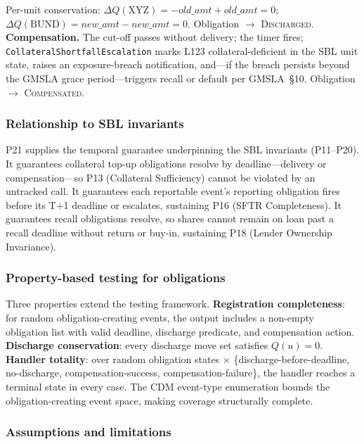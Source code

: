 \noindent Per-unit conservation: $\Delta Q(\text{XYZ}) = -\mathit{old\_amt} + \mathit{old\_amt} = 0$; $\Delta Q(\text{BUND}) = \mathit{new\_amt} - \mathit{new\_amt} = 0$. Obligation $\to$ \textsc{Discharged}. \textbf{Compensation.} The cut-off passes without delivery; the timer fires; \texttt{CollateralShortfallEscalation} marks L123 collateral-deficient in the SBL unit state, raises an exposure-breach notification, and---if the breach persists beyond the GMSLA grace period---triggers recall or default per GMSLA~\S10. Obligation $\to$ \textsc{Compensated}.

\subsubsection{Relationship to SBL invariants}
\label{sec:obligation-sbl-relationship}

P21 supplies the temporal guarantee underpinning the SBL invariants (P11--P20). It guarantees collateral top-up obligations resolve by deadline---delivery or compensation---so P13 (Collateral Sufficiency) cannot be violated by an untracked call. It guarantees each reportable event's reporting obligation fires before its T+1 deadline or escalates, sustaining P16 (SFTR Completeness). It guarantees recall obligations resolve, so shares cannot remain on loan past a recall deadline without return or buy-in, sustaining P18 (Lender Ownership Invariance).

\subsubsection{Property-based testing for obligations}
\label{sec:obligation-testing}

Three properties extend the testing framework. \textbf{Registration completeness}: for random obligation-creating events, the output includes a non-empty obligation list with valid deadline, discharge predicate, and compensation action. \textbf{Discharge conservation}: every discharge move set satisfies $Q(u) = 0$. \textbf{Handler totality}: over random obligation states $\times$ \{discharge-before-deadline, no-discharge, compensation-success, compensation-failure\}, the handler reaches a terminal state in every case. The CDM event-type enumeration bounds the obligation-creating event space, making coverage structurally complete.

\subsubsection{Assumptions and limitations}
\label{sec:obligation-limitations}

